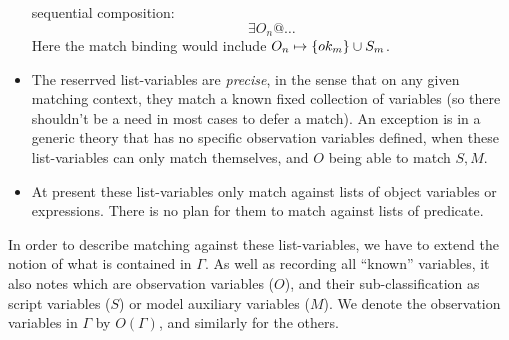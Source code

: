 \begin{itemize}
    sequential composition:
    $$
      \exists O_n @ \ldots
    $$
    Here the match binding would include
    $O_n \mapsto \{ok_m\} \cup S_m$.
  \item
    The reserrved list-variables are \emph{precise},
    in the sense that on any given matching context,
    they match a known fixed collection of variables
    (so there shouldn't be a need in most cases to defer a match).
    An exception is in a generic theory that has no specific observation
    variables defined, when these list-variables can only match
    themselves, and $O$ being able to match $S,M$.
  \item
    At present these list-variables only match against lists
    of object variables or expressions.
    There is no plan for them to match against lists of predicate.
\end{itemize}

In order to describe matching against these list-variables,
we have to extend the notion of what is contained in $\Gamma$.
As well as recording all ``known'' variables,
it also notes which are observation variables ($O$),
and their sub-classification as script variables ($S$)
or model auxiliary variables ($M$).
We denote the observation variables in $\Gamma$ by $O(\Gamma)$,
and similarly for the others.
